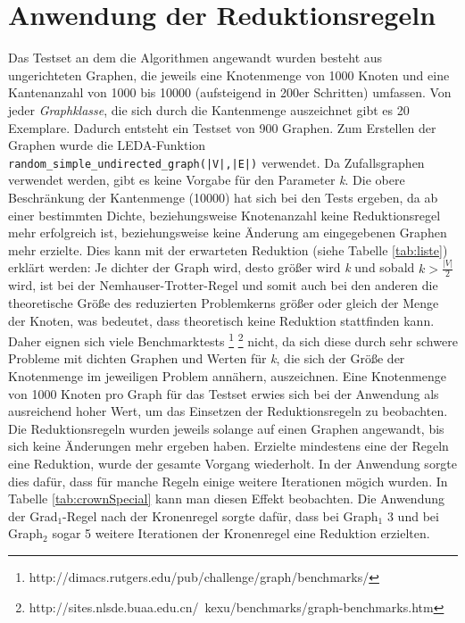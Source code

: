 \section{Anwendung der Reduktionsregeln}
\label{ch:Analyse:sec:Anwendung}

Das Testset an dem die Algorithmen angewandt wurden besteht aus ungerichteten Graphen, die jeweils eine Knotenmenge von 1000 Knoten und eine Kantenanzahl von 1000 bis 10000 (aufsteigend in 200er Schritten) umfassen. Von jeder \emph{Graphklasse}, die sich durch die Kantenmenge auszeichnet gibt es 20 Exemplare. Dadurch entsteht ein Testset von 900 Graphen. Zum Erstellen der Graphen wurde die LEDA-Funktion \lstinline{random_simple_undirected_graph(|V|,|E|)} \cite{manual} verwendet. Da Zufallsgraphen verwendet werden, gibt es keine Vorgabe für den Parameter \emph{k}. Die obere Beschränkung der Kantenmenge (10000) hat sich bei den Tests ergeben, da ab einer bestimmten Dichte, beziehungsweise Knotenanzahl keine Reduktionsregel mehr erfolgreich ist, beziehungsweise keine Änderung am eingegebenen Graphen mehr erzielte. Dies kann mit der erwarteten Reduktion (siehe Tabelle \ref{tab:liste}) erklärt werden: Je dichter der Graph wird, desto größer wird \emph{k} und sobald $k>\frac{|V|}{2}$ wird, ist bei der Nemhauser-Trotter-Regel und somit auch bei den anderen die theoretische Größe des reduzierten Problemkerns größer oder gleich der Menge der Knoten, was bedeutet, dass theoretisch keine Reduktion stattfinden kann. Daher eignen sich viele Benchmarktests \footnote{http://dimacs.rutgers.edu/pub/challenge/graph/benchmarks/} \footnote{http://sites.nlsde.buaa.edu.cn/~kexu/benchmarks/graph-benchmarks.htm} nicht, da sich diese durch sehr schwere Probleme mit dichten Graphen und Werten für \emph{k}, die sich der Größe der Knotenmenge im jeweiligen Problem annähern, auszeichnen. Eine Knotenmenge von 1000 Knoten pro Graph für das Testset erwies sich bei der Anwendung als ausreichend hoher Wert, um das Einsetzen der Reduktionsregeln zu beobachten.\\
Die Reduktionsregeln wurden jeweils solange auf einen Graphen angewandt, bis sich keine Änderungen mehr ergeben haben. Erzielte mindestens eine der Regeln eine Reduktion, wurde der gesamte Vorgang wiederholt. In der Anwendung sorgte dies dafür, dass für manche Regeln einige weitere Iterationen mögich wurden. In Tabelle \ref{tab:crownSpecial} kann man diesen Effekt beobachten. Die Anwendung der Grad$_{1}$-Regel nach der Kronenregel sorgte dafür, dass bei Graph$_{1}$ 3 und bei Graph$_{2}$ sogar 5 weitere Iterationen der Kronenregel eine Reduktion erzielten.
